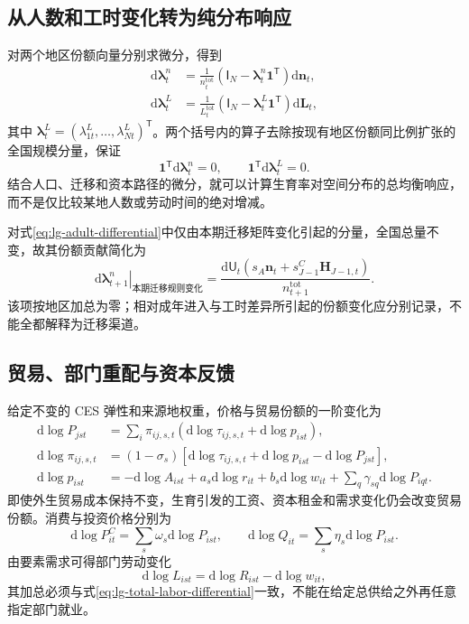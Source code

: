 \documentclass[UTF8,a4paper,zihao=-4,fontset=windows]{ctexart}
\numberwithin{equation}{section}
\newcommand{\pc}{P^{C}}
\newcommand{\invp}{Q}
\newcommand{\dd}{\mathrm{d}}
\newcommand{\ones}{\bm{1}}
\newcommand{\Id}{\mathsf{I}}
\begin{document}
\subsection{从人数和工时变化转为纯分布响应}
对两个地区份额向量分别求微分，得到
\begin{align}
 \dd\bm\lambda^n_t&=\frac{1}{n_t^{\mathrm{tot}}}
 \left(\Id_N-\bm\lambda^n_t\ones^{\mathsf T}\right)\dd\bm n_t,
 \label{eq:lg-headcount-share-differential}\\
 \dd\bm\lambda^L_t&=\frac{1}{L_t^{\mathrm{tot}}}
 \left(\Id_N-\bm\lambda^L_t\ones^{\mathsf T}\right)\dd\bm L_t,
 \label{eq:lg-effective-share-differential}
\end{align}
其中 $\bm\lambda^L_t=(\lambda^L_{1t},\ldots,\lambda^L_{Nt})^{\mathsf T}$。两个括号内的算子去除按现有地区份额同比例扩张的全国规模分量，保证
\begin{equation}
 \ones^{\mathsf T}\dd\bm\lambda^n_t=0,\qquad
 \ones^{\mathsf T}\dd\bm\lambda^L_t=0.
 \label{eq:lg-share-zero-sum}
\end{equation}
结合人口、迁移和资本路径的微分，就可以计算生育率对空间分布的总均衡响应，而不是仅比较某地人数或劳动时间的绝对增减。

对式\eqref{eq:lg-adult-differential}中仅由本期迁移矩阵变化引起的分量，全国总量不变，故其份额贡献简化为
\begin{equation}
 \left.\dd\bm\lambda^n_{t+1}\right|_{\text{本期迁移规则变化}}
 =\frac{\dd\mathsf U_t
 \left(s_A\bm n_t+s^C_{J-1}\bm H_{J-1,t}\right)}{n_{t+1}^{\mathrm{tot}}}.
 \label{eq:lg-migration-share-contribution}
\end{equation}
该项按地区加总为零；相对成年进入与工时差异所引起的份额变化应分别记录，不能全都解释为迁移渠道。

\subsection{贸易、部门重配与资本反馈}
给定不变的 CES 弹性和来源地权重，价格与贸易份额的一阶变化为
\begin{align}
 \dd\log P_{jst}&=\sum_i\pi_{ij,s,t}
 \left(\dd\log\tau_{ij,s,t}+\dd\log p_{ist}\right),
 \label{eq:lg-price-differential}\\
 \dd\log\pi_{ij,s,t}&=(1-\sigma_s)\left[
 \dd\log\tau_{ij,s,t}+\dd\log p_{ist}-\dd\log P_{jst}\right],\\
 \dd\log p_{ist}&=-\dd\log A_{ist}+a_s\dd\log r_{it}
 +b_s\dd\log w_{it}+\sum_q\gamma_{sq}\dd\log P_{iqt}.
 \label{eq:lg-cost-differential}
\end{align}
即使外生贸易成本保持不变，生育引发的工资、资本租金和需求变化仍会改变贸易份额。消费与投资价格分别为
\begin{equation}
 \dd\log\pc_{it}=\sum_s\omega_s\dd\log P_{ist},\qquad
 \dd\log\invp_{it}=\sum_s\eta_s\dd\log P_{ist}.
\end{equation}
由要素需求可得部门劳动变化
\begin{equation}
 \dd\log L_{ist}=\dd\log R_{ist}-\dd\log w_{it},
 \label{eq:lg-sector-labor-response}
\end{equation}
其加总必须与式\eqref{eq:lg-total-labor-differential}一致，不能在给定总供给之外再任意指定部门就业。
\end{document}
